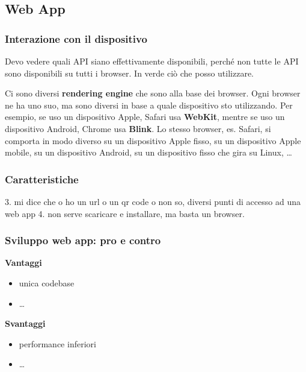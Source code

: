 \subsection{Web App}
\subsubsection{Interazione con il dispositivo}
\par Devo vedere quali API siano effettivamente disponibili, perché non tutte le API sono disponibili su tutti i browser. In verde ciò che posso utilizzare.
\par Ci sono diversi \textbf{rendering engine} che sono alla base dei browser. Ogni browser ne ha uno suo, ma sono diversi in base a quale dispositivo sto utilizzando. Per esempio, se uso un dispositivo Apple, Safari usa \textbf{WebKit}, mentre se uso un dispositivo Android, Chrome usa \textbf{Blink}. Lo stesso browser, es. Safari, si comporta in modo diverso su un dispositivo Apple fisso, su un dispositivo Apple mobile, su un dispositivo Android, su un dispositivo fisso che gira su Linux, \dots

\subsubsection{Caratteristiche}
3. mi dice che  o ho un url o un qr code o non so, diversi punti di accesso ad una web app 
4. non serve scaricare e installare, ma basta un browser.

\subsubsection{Sviluppo web app: pro e contro}
\par \textbf{Vantaggi}
\begin{itemize}
    \item unica codebase
    \item \dots
\end{itemize}

\par \textbf{Svantaggi}
\begin{itemize}
    \item performance inferiori 
    \item \dots
\end{itemize}


